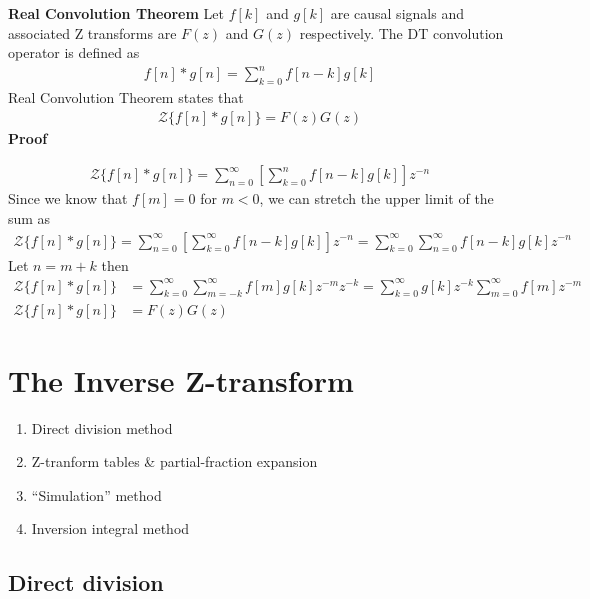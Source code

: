 \documentclass[twoside]{article}
\begin{document}
\textbf{Real Convolution Theorem}
%
Let $f[k]$ and $g[k]$ are causal signals and associated Z transforms
are $F(z)$ and $G(z)$ respectively.
%
The DT convolution operator is defined as
%
\begin{align*}
 f[n] \ast g[n] = \sum\limits_{k=0}^{n} f[n-k] g[k]
\end{align*}
%
Real Convolution Theorem states that
%
\begin{align*}
 \mathcal{Z} \lbrace f[n] \ast g[n] \rbrace = F(z) G(z)
\end{align*}
%
\textbf{Proof}

\begin{align*}
 \mathcal{Z} \lbrace f[n] \ast g[n] \rbrace =
  \sum\limits_{n=0}^{\infty} \left [ \sum\limits_{k=0}^{n} f[n-k] g[k]
  \right] z^{-n}
\end{align*}
%
Since we know that $f[m] = 0$ for $m<0$, we can stretch the upper
limit of the sum as
%
\begin{align*}
 \mathcal{Z} \lbrace f[n] \ast g[n] \rbrace =
  \sum\limits_{n=0}^{\infty} \left [ \sum\limits_{k=0}^{\infty} f[n-k] g[k]
  \right] z^{-n}
 = \sum\limits_{k=0}^{\infty} \sum\limits_{n=0}^{\infty}  f[n-k] g[k] z^{-n}
\end{align*}
%
Let $n = m + k$ then 
%
\begin{align*}
 \mathcal{Z} \lbrace f[n] \ast g[n] \rbrace &=
  \sum\limits_{k=0}^{\infty}  \sum\limits_{m=-k}^{\infty} f[m] g[k]
  z^{-m} z^{-k}
  = \sum\limits_{k=0}^{\infty} g[k] z^{-k} \sum\limits_{m=0}^{\infty}
  f[m] z^{-m} 
\\
 \mathcal{Z} \lbrace f[n] \ast g[n] \rbrace &= F(z) G(z) 
\end{align*}
%

\section*{The Inverse Z-transform}

\begin{enumerate}
 \item Direct division method
 \item Z-tranform tables \& partial-fraction expansion 
 \item ``Simulation'' method
 \item Inversion integral method
\end{enumerate}

\subsection*{Direct division}
\end{document}
